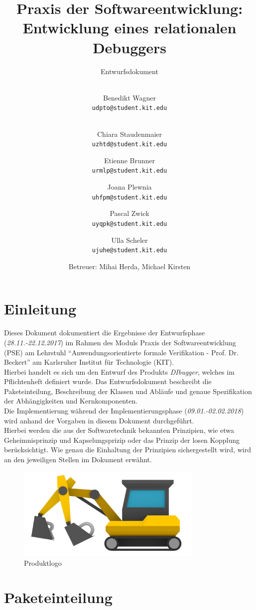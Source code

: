 \documentclass[parskip=full]{scrartcl}
\title{
	\vspace{2cm}
	\myfont 
	Praxis der Softwareentwicklung:\\ 
	Entwicklung eines relationalen Debuggers\\
}
\subtitle{
	\vspace{1cm}
	\myfont
	Entwurfsdokument
}
\author{
	\vspace{1cm} \\
	Benedikt Wagner\\
	\texttt{udpto@student.kit.edu}
	\and \vspace{1cm} \\ Chiara Staudenmaier\\
	\texttt{uzhtd@student.kit.edu}
	\and Etienne Brunner\\
	\texttt{urmlp@student.kit.edu}
	\and Joana Plewnia\\
	\texttt{uhfpm@student.kit.edu} 
	\and Pascal Zwick\\
	\texttt{uyqpk@student.kit.edu}
	\and Ulla Scheler\\
	\texttt{ujuhe@student.kit.edu}
	\vspace{1cm}
	\and Betreuer: Mihai Herda, Michael Kirsten
	\vspace{4cm}
}
\begin{document}
\clearpage
\maketitle
{}
\newpage

\tableofcontents
\newpage
{}
\section{Einleitung}
Dieses Dokument dokumentiert die Ergebnisse der Entwurfsphase (\textit{28.11.-22.12.2017}) im Rahmen
des Moduls Praxis der Softwareentwicklung (PSE) am Lehrstuhl \enquote{Anwendungsorientierte formale Verifikation - Prof. Dr. Beckert} am Karlsruher Institut für Technologie (KIT).\\
Hierbei handelt es sich um den Entwurf des Produkts \textit{DIbugger}, welches im Pflichtenheft definiert wurde. 
Das Entwurfsdokument beschreibt die Paketeinteilung, Beschreibung der Klassen und Abläufe und genaue Spezifikation der Abhängigkeiten und Kernkomponenten. 
\\Die Implementierung während der Implementierungsphase (\textit{09.01.-02.02.2018}) wird anhand der Vorgaben in diesem Dokument durchgeführt. \\
Hierbei werden die aus der Softwaretechnik bekannten Prinzipien, wie etwa Geheimnisprinzip und Kapselungsprizip oder das Prinzip der losen Kopplung berücksichtigt. Wie genau die Einhaltung der Prinzipien sichergestellt wird, wird an den jeweiligen Stellen im Dokument erwähnt. 
\vspace{1cm}
\begin{figure}[!h]
\centering
\includegraphics[width=0.8\textwidth]{../Plichtenheft/logo_nongi.png}
\caption{Produktlogo}
\end{figure}

\newpage


\section{Paketeinteilung}\label{Packages} %
\end{document}
